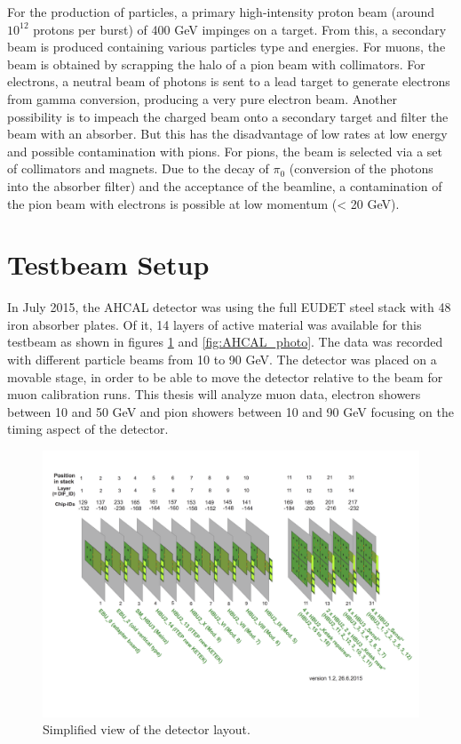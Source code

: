 For the production of particles, a primary high-intensity proton beam (around $10^{12}$ protons per burst) of 400 GeV impinges on a target. From this, a secondary beam is produced containing various particles type and energies. For muons, the beam is obtained by scrapping the halo of a pion beam with collimators. For electrons, a neutral beam of photons is sent to a lead target to generate electrons from gamma conversion, producing a very pure electron beam. Another possibility is to impeach the charged beam onto a secondary target and filter the beam with an absorber. But this has the disadvantage of low rates at low energy and possible contamination with pions. For pions, the beam is selected via a set of collimators and magnets. Due to the decay of $\pi_0$ (conversion of the photons into the absorber filter) and the acceptance of the beamline, a contamination of the pion beam with electrons is possible at low momentum (< 20 GeV).

\section{Testbeam Setup}
\label{sec:TBsetup}

In July 2015, the AHCAL detector was using the full EUDET steel stack \cite{EUDET-Report-2010-02} with 48 iron absorber plates. Of it, 14 layers of active material was available for this testbeam as shown in figures \ref{fig:Det_layout} and \ref{fig:AHCAL_photo}. The data was recorded with different particle beams from 10 to 90 GeV. The detector was placed on a movable stage, in order to be able to move the detector relative to the beam for muon calibration runs. This thesis will analyze muon data, electron showers between 10 and 50 GeV and pion showers between 10 and 90 GeV focusing on the timing aspect of the detector.
\begin{figure}[htbp!]
	\centering
	\includegraphics[width=1\linewidth]{chap5/fig_EnergyCalib/Detector_layout.png}
	\caption{Simplified view of the detector layout.} \label{fig:Det_layout}
\end{figure}

